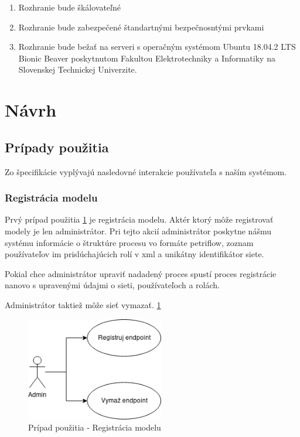 \begin{enumerate} 
    \item Rozhranie bude škálovateľné 
     
    \item Rozhranie bude zabezpečené štandartnými bezpečnosntými prvkami
    
    \item Rozhranie bude bežať na serveri s operačným systémom Ubuntu 18.04.2 LTS Bionic Beaver poskytnutom Fakultou Elektrotechniky a Informatiky na Slovenskej Technickej Univerzite.  
\end{enumerate} 

  

\section{Návrh} 



 

\subsection{Prípady použitia}
Zo špecifikácie vyplývajú nasledovné interakcie používateľa s naším systémom.

\subsubsection{Registrácia modelu}
Prvý prípad použitia \ref{usecase1} je registrácia modelu. Aktér ktorý môže registrovať modely je len administrátor. Pri tejto akcií administrátor poskytne nášmu systému informácie o štruktúre procesu vo formáte petriflow, zoznam používateľov im prislúchajúcich rolí v \acrshort{xml} a unikátny identifikátor siete. 

Pokial chce administrátor upraviť nadadený proces spustí proces registrácie nanovo s upravenými údajmi o sieti, používateľoch a rolách.

Administrátor taktiež môže sieť vymazať. \ref{usecase1}
\begin{figure}[!htbp]
	\centering
	\includegraphics[width=6cm]{img/dp_usecase_1_register.png}
	\caption{Prípad použitia - Registrácia modelu}
	\label{usecase1}
\end{figure} 

